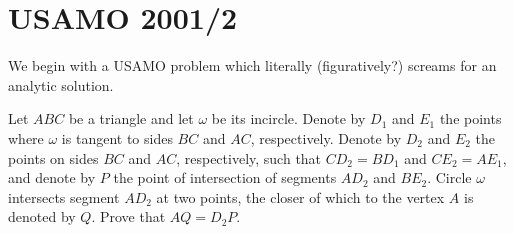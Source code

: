 \section{USAMO 2001/2}
\label{exam:2001usamo2}
We begin with a USAMO problem which literally (figuratively?) screams for an analytic solution.

\secps
\begin{problem}[USAMO 2001/2]
  Let $ABC$ be a triangle and let $\omega$ be its incircle. Denote by $D_1$ and $E_1$ the points where $\omega$ is tangent to sides $BC$ and $AC$, respectively. Denote by $D_2$ and $E_2$ the points on sides $BC$ and $AC$, respectively, such that $CD_2=BD_1$ and $CE_2=AE_1$, and denote by $P$ the point of intersection of segments $AD_2$ and $BE_2$. Circle $\omega$ intersects segment $AD_2$ at two points, the closer of which to the vertex $A$ is denoted by $Q$. Prove that $AQ=D_2P$.
\end{problem}


